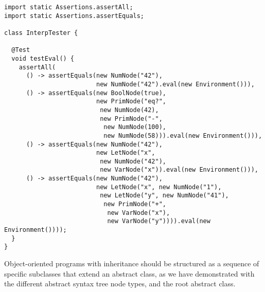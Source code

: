 \begin{lstlisting}[language=MyJava]
import static Assertions.assertAll;
import static Assertions.assertEquals;
  
class InterpTester {
  
  @Test
  void testEval() {
    assertAll(
      () -> assertEquals(new NumNode("42"),
                         new NumNode("42").eval(new Environment())),
      () -> assertEquals(new BoolNode(true),
                         new PrimNode("eq?",
                          new NumNode(42),
                          new PrimNode("-",
                           new NumNode(100),
                           new NumNode(58))).eval(new Environment())),
      () -> assertEquals(new NumNode("42"),
                         new LetNode("x", 
                          new NumNode("42"), 
                          new VarNode("x")).eval(new Environment())),
      () -> assertEquals(new NumNode("42"),
                         new LetNode("x", new NumNode("1"),
                          new LetNode("y", new NumNode("41"),
                           new PrimNode("+", 
                            new VarNode("x"), 
                            new VarNode("y")))).eval(new Environment())));
  }
}
\end{lstlisting}

Object-oriented programs with inheritance should be structured as a sequence of specific subclasses that extend an abstract class, as we have demonstrated with the different abstract syntax tree node types, and the root  abstract class. 

